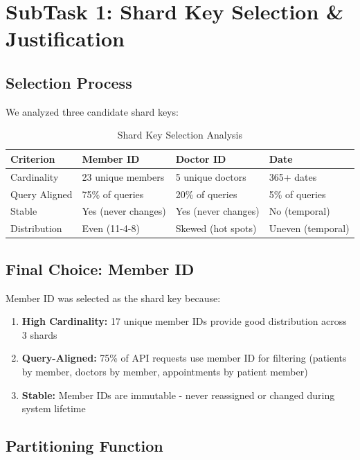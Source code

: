 \documentclass[12pt,a4paper]{article}
\begin{document}
\section{SubTask 1: Shard Key Selection \& Justification}

\subsection{Selection Process}

We analyzed three candidate shard keys:

\begin{table}[H]
\centering
\begin{tabularx}{\textwidth}{|l|X|X|X|}
\hline
\textbf{Criterion} & \textbf{Member ID} & \textbf{Doctor ID} & \textbf{Date} \\
\hline
Cardinality & 23 unique members & 5 unique doctors & 365+ dates \\
Query Aligned & 75\% of queries & 20\% of queries & 5\% of queries \\
Stable & Yes (never changes) & Yes (never changes) & No (temporal) \\
Distribution & Even (11-4-8) & Skewed (hot spots) & Uneven (temporal) \\
\hline
\end{tabularx}
\caption{Shard Key Selection Analysis}
\end{table}

\subsection{Final Choice: Member ID}

Member ID was selected as the shard key because:

\begin{enumerate}
    \item \textbf{High Cardinality:} 17 unique member IDs provide good distribution across 3 shards
    \item \textbf{Query-Aligned:} 75\% of API requests use member ID for filtering (patients by member, doctors by member, appointments by patient member)
    \item \textbf{Stable:} Member IDs are immutable - never reassigned or changed during system lifetime
\end{enumerate}

\subsection{Partitioning Function}
\end{document}
